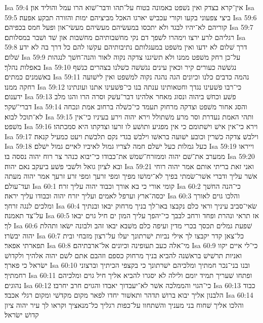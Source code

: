 Isa 59:4  אין־קרא בצדק ואין נשׁפט באמונה בטוח על־תהו ודבר־שׁוא הרו עמל והוליד און׃
Isa 59:5  ביצי צפעוני בקעו וקורי עכבישׁ יארגו האכל מביציהם ימות והזורה תבקע אפעה׃
Isa 59:6  קוריהם לא־יהיו לבגד ולא יתכסו במעשׂיהם מעשׂיהם מעשׂי־און ופעל חמס בכפיהם׃
Isa 59:7  רגליהם לרע ירצו וימהרו לשׁפך דם נקי מחשׁבותיהם מחשׁבות און שׁד ושׁבר במסלותם׃
Isa 59:8  דרך שׁלום לא ידעו ואין משׁפט במעגלותם נתיבותיהם עקשׁו להם כל דרך בה לא ידע שׁלום׃
Isa 59:9  על־כן רחק משׁפט ממנו ולא תשׂיגנו צדקה נקוה לאור והנה־חשׁך לנגהות באפלות נהלך׃
Isa 59:10  נגשׁשׁה כעורים קיר וכאין עינים נגשׁשׁה כשׁלנו בצהרים כנשׁף באשׁמנים כמתים׃
Isa 59:11  נהמה כדבים כלנו וכיונים הגה נהגה נקוה למשׁפט ואין לישׁועה רחקה ממנו׃
Isa 59:12  כי־רבו פשׁעינו נגדך וחטאותינו ענתה בנו כי־פשׁעינו אתנו ועונתינו ידענום׃
Isa 59:13  פשׁע וכחשׁ ביהוה ונסוג מאחר אלהינו דבר־עשׁק וסרה הרו והגו מלב דברי־שׁקר׃
Isa 59:14  והסג אחור משׁפט וצדקה מרחוק תעמד כי־כשׁלה ברחוב אמת ונכחה לא־תוכל לבוא׃
Isa 59:15  ותהי האמת נעדרת וסר מרע משׁתולל וירא יהוה וירע בעיניו כי־אין משׁפט׃
Isa 59:16  וירא כי־אין אישׁ וישׁתומם כי אין מפגיע ותושׁע לו זרעו וצדקתו היא סמכתהו׃
Isa 59:17  וילבשׁ צדקה כשׁרין וכובע ישׁועה בראשׁו וילבשׁ בגדי נקם תלבשׁת ויעט כמעיל קנאה׃
Isa 59:18  כעל גמלות כעל ישׁלם חמה לצריו גמול לאיביו לאיים גמול ישׁלם׃
Isa 59:19  וייראו ממערב את־שׁם יהוה וממזרח־שׁמשׁ את־כבודו כי־יבוא כנהר צר רוח יהוה נססה בו׃
Isa 59:20  ובא לציון גואל ולשׁבי פשׁע ביעקב נאם יהוה׃
Isa 59:21  ואני זאת בריתי אותם אמר יהוה רוחי אשׁר עליך ודברי אשׁר־שׂמתי בפיך לא־ימושׁו מפיך ומפי זרעך ומפי זרע זרעך אמר יהוה מעתה ועד־עולם׃
Isa 60:1  קומי אורי כי בא אורך וכבוד יהוה עליך זרח׃
Isa 60:2  כי־הנה החשׁך יכסה־ארץ וערפל לאמים ועליך יזרח יהוה וכבודו עליך יראה׃
Isa 60:3  והלכו גוים לאורך ומלכים לנגה זרחך׃
Isa 60:4  שׂאי־סביב עיניך וראי כלם נקבצו באו־לך בניך מרחוק יבאו ובנתיך על־צד תאמנה׃
Isa 60:5  אז תראי ונהרת ופחד ורחב לבבך כי־יהפך עליך המון ים חיל גוים יבאו לך׃
Isa 60:6  שׁפעת גמלים תכסך בכרי מדין ועיפה כלם משׁבא יבאו זהב ולבונה ישׂאו ותהלת יהוה יבשׂרו׃
Isa 60:7  כל־צאן קדר יקבצו לך אילי נביות ישׁרתונך יעלו על־רצון מזבחי ובית תפארתי אפאר׃
Isa 60:8  מי־אלה כעב תעופינה וכיונים אל־ארבתיהם׃
Isa 60:9  כי־לי איים יקוו ואניות תרשׁישׁ בראשׁנה להביא בניך מרחוק כספם וזהבם אתם לשׁם יהוה אלהיך ולקדושׁ ישׂראל כי פארך׃
Isa 60:10  ובנו בני־נכר חמתיך ומלכיהם ישׁרתונך כי בקצפי הכיתיך וברצוני רחמתיך׃
Isa 60:11  ופתחו שׁעריך תמיד יומם ולילה לא יסגרו להביא אליך חיל גוים ומלכיהם נהוגים׃
Isa 60:12  כי־הגוי והממלכה אשׁר לא־יעבדוך יאבדו והגוים חרב יחרבו׃
Isa 60:13  כבוד הלבנון אליך יבוא ברושׁ תדהר ותאשׁור יחדו לפאר מקום מקדשׁי ומקום רגלי אכבד׃
Isa 60:14  והלכו אליך שׁחוח בני מעניך והשׁתחוו על־כפות רגליך כל־מנאציך וקראו לך עיר יהוה ציון קדושׁ ישׂראל׃
